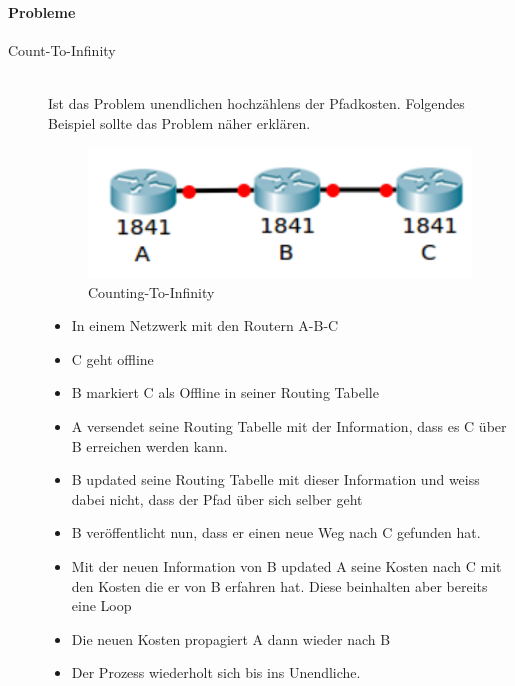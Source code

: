 \paragraph{Probleme}
\begin{description} 
	\item[Count-To-Infinity] \hfill \\
	Ist das Problem unendlichen hochzählens der Pfadkosten. Folgendes Beispiel sollte das Problem näher erklären.
	\begin{figure}[h]
		\centering
		\includegraphics[width=0.3\linewidth]{images/rip_counting_infinity}
		\caption{Counting-To-Infinity}
	\end{figure}
	\begin{itemize}
		\item In einem Netzwerk mit den Routern A-B-C
		\item C geht offline
		\item B markiert C als Offline in seiner Routing Tabelle
		\item A versendet seine Routing Tabelle mit der Information, dass es C über B erreichen werden kann.
		\item B updated seine Routing Tabelle mit dieser Information und weiss dabei nicht, dass der Pfad über sich selber geht
		\item B veröffentlicht nun, dass er einen neue Weg nach C gefunden hat.
		\item Mit der neuen Information von B updated A seine Kosten nach C mit den Kosten die er von B erfahren hat. Diese beinhalten aber bereits eine Loop
		\item Die neuen Kosten propagiert A dann wieder nach B
		\item Der Prozess wiederholt sich bis ins Unendliche.
	\end{itemize}
\end{description}

